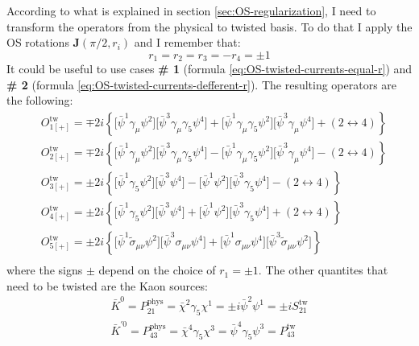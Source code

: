 \documentclass[english, LaM, oneside, noexaminfo]{sapthesis}
\begin{document}
According to what is explained in section \ref{sec:OS-regularization}, I need to transform the operators from the physical to twisted basis.
To do that I apply the OS rotations $\mathbf{J}(\pi/2,r_i)$ and I remember that:
\begin{equation*}
    r_1 = r_2 = r_3 = - r_4 = \pm 1
\end{equation*}
It could be useful to use cases {\bf \# 1} (formula \ref{eq:OS-twisted-currents-equal-r}) and {\bf \# 2} (formula \ref{eq:OS-twisted-currents-defferent-r}).
The resulting operators are the following:
\begin{equation}\label{eq:O_i-operators-twisted-final}
    \begin{split}
        & O_{1[+]}^\text{tw} = \mp 2i \left\{\big[\bar\psi^1 \gamma_\mu \psi^2 \big] \big[\bar\psi^3 \gamma_\mu \gamma_5 \psi^4 \big] + \big[ \bar\psi^1 \gamma_\mu \gamma_5 \psi^2 \big] \big[ \bar\psi^3 \gamma_\mu \psi^4 \big] + \left(2\leftrightarrow 4\right)\right\} \\
        & O_{2[+]}^\text{tw} = \mp 2i \left\{\big[\bar\psi^1 \gamma_\mu \psi^2 \big] \big[\bar\psi^3 \gamma_\mu \gamma_5 \psi^4 \big] - \big[ \bar\psi^1 \gamma_\mu \gamma_5 \psi^2 \big] \big[ \bar\psi^3 \gamma_\mu \psi^4 \big] - \left(2\leftrightarrow 4\right)\right\} \\
        & O_{3[+]}^\text{tw} = \pm 2i \left\{\big[\bar\psi^1 \gamma_5 \psi^2 \big] \big[ \bar\psi^3 \psi^4 \big] - \big[ \bar\psi^1 \psi^2 \big] \big[ \bar\psi^3 \gamma_5 \psi^4\big] - \left(2\leftrightarrow 4\right)\right\} \\
        & O_{4[+]}^\text{tw} = \pm 2i \left\{\big[\bar\psi^1 \gamma_5 \psi^2 \big] \big[ \bar\psi^3 \psi^4 \big] + \big[ \bar\psi^1 \psi^2 \big] \big[ \bar\psi^3 \gamma_5 \psi^4\big] + \left(2\leftrightarrow 4\right)\right\} \\
        & O_{5[+]}^\text{tw} = \pm 2i \left\{\big[\bar\psi^1 \tilde\sigma_{\mu\nu} \psi^2 \big] \big[ \bar\psi^3 \sigma_{\mu\nu} \psi^4 \big] + \big[\bar\psi^1 \sigma_{\mu\nu} \psi^4 \big] \big[ \bar\psi^3 \tilde\sigma_{\mu\nu} \psi^2 \big] \right\} \\
    \end{split}
\end{equation}
where the signs $\pm$ depend on the choice of $r_1=\pm1$.
The other quantites that need to be twisted are the Kaon sources:
\begin{equation*}
    \begin{gathered}
        \bar K^{0} = P^\text{phys}_{21} = \bar\chi^2 \gamma_5 \chi^1 = \pm i \bar\psi^2 \psi^1 = \pm i S^\text{tw}_{21} \\
        \bar K^{'0} = P^\text{phys}_{43} = \bar\chi^4 \gamma_5 \chi^3 = \bar\psi^4 \gamma_5 \psi^3 = P^\text{tw}_{43} \\
    \end{gathered}
\end{equation*}
\end{document}
